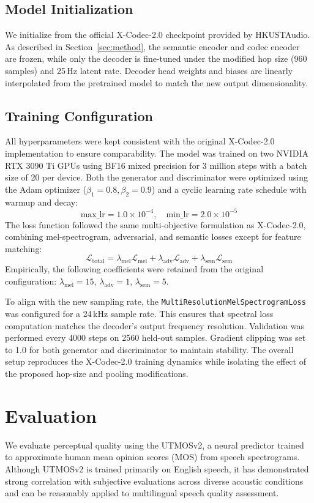 \documentclass[preprint]{article}
\begin{document}
\subsection{Model Initialization}
We initialize from the official X-Codec-2.0 checkpoint provided by HKUSTAudio.
As described in Section~\ref{sec:method}, the semantic encoder and codec encoder are frozen, while only the decoder is fine-tuned under the modified hop size (960 samples) and 25\,Hz latent rate.
Decoder head weights and biases are linearly interpolated from the pretrained model to match the new output dimensionality.

\subsection{Training Configuration}
All hyperparameters were kept consistent with the original X-Codec-2.0 implementation to ensure comparability. The model was trained on two NVIDIA RTX 3090 Ti GPUs using BF16 mixed precision for 3 million steps with a batch size of 20 per device. Both the generator and discriminator were optimized using the Adam optimizer (\(\beta_1 = 0.8, \beta_2 = 0.9\)) and a cyclic learning rate schedule with warmup and decay:
\[
\text{max\_lr} = 1.0\times10^{-4}, \quad
\text{min\_lr} = 2.0\times10^{-5}
\]
The loss function followed the same multi-objective formulation as X-Codec-2.0, combining mel-spectrogram, adversarial, and semantic losses except for feature matching:
\[
\mathcal{L}_{\text{total}} =
\lambda_{\text{mel}}\mathcal{L}_{\text{mel}} +
\lambda_{\text{adv}}\mathcal{L}_{\text{adv}} +
\lambda_{\text{sem}}\mathcal{L}_{\text{sem}}
\]
Empirically, the following coefficients were retained from the original configuration:
\(\lambda_{\text{mel}}=15\),
\(\lambda_{\text{adv}}=1\),
\(\lambda_{\text{sem}}=5\).

To align with the new sampling rate, the \texttt{MultiResolutionMelSpectrogramLoss} was configured for a 24\,kHz sample rate. This ensures that spectral loss computation matches the decoder's output frequency resolution. Validation was performed every 4000 steps on 2560 held-out samples. Gradient clipping was set to 1.0 for both generator and discriminator to maintain stability. The overall setup reproduces the X-Codec-2.0 training dynamics while isolating the effect of the proposed hop-size and pooling modifications.

\section{Evaluation}
We evaluate perceptual quality using the UTMOSv2, a neural predictor trained to approximate human mean opinion scores (MOS) from speech spectrograms. 
Although UTMOSv2 is trained primarily on English speech, it has demonstrated strong correlation with subjective evaluations across diverse acoustic conditions and can be reasonably applied to multilingual speech quality assessment.
\end{document}

